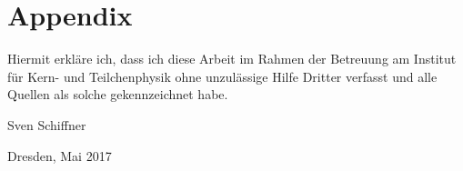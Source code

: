 \appendix

\chapter{Appendix}


\clearpage
\thispagestyle{empty}
\vspace*{1.5em}

Hiermit erkläre ich, dass ich diese Arbeit im Rahmen der Betreuung am Institut
für Kern- und Teilchenphysik ohne unzulässige Hilfe Dritter verfasst und alle Quellen als solche gekennzeichnet habe.

\vspace*{45em}

Sven Schiffner \par
Dresden, Mai 2017


